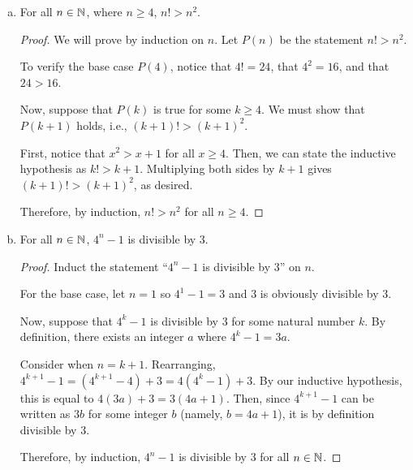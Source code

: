 \begin{enumerate}[(a)]
\begin{proof}
          Verify the base case $P(1)$:
          \[ \sum^1_{i=1} \frac{i}{2^i} = \frac{1}{2} = 2 - \frac{3}{2} = 2 -\frac{1+2}{2^1} \]
          Suppose that $P(k)$ holds for some $k$, and consider $P(k+1)$. Now,
          \begin{align*}
            \sum^{n+1}_{i=1} \frac{i}{2^i}
             & = \frac{k+1}{2^{k+1}} + \sum^n_{i=1} \frac{i}{2^i} \\
             & = \frac{k+1}{2^{k+1}} + 2-\frac{k+2}{2^k} \IH      \\
             & = 2 + \frac{k+1 - 2(k+2)}{2^{k+1}}                 \\
             & = 2 - \frac{k+3}{2^{k+1}}
          \end{align*}
          as required.
          Because $P(1)$ holds and $P(k)$ implies $P(k+1)$, by induction, $P(n)$ holds for all $n$.
        \end{proof}
  \item For all $n\in\mathbb{N}$, where $n \geq 4$, $n! > n^2$.
        \begin{proof}
          We will prove by induction on $n$.
          Let $P(n)$ be the statement $n! > n^2$.

          To verify the base case $P(4)$, notice that $4! = 24$, that $4^2 = 16$, and that $24 > 16$.

          Now, suppose that $P(k)$ is true for some $k \geq 4$.
          We must show that $P(k+1)$ holds, i.e., $(k+1)! > (k+1)^2$.

          First, notice that $x^2 > x+1$ for all $x \geq 4$.
          Then, we can state the inductive hypothesis as $k! > k+1$.
          Multiplying both sides by $k+1$ gives $(k+1)! > (k+1)^2$, as desired.

          Therefore, by induction, $n! > n^2$ for all $n \geq 4$.
        \end{proof}
  \item For all $n\in\mathbb{N}$, $4^n-1$ is divisible by 3.
        \begin{proof}
          Induct the statement ``$4^n-1$ is divisible by 3'' on $n$.

          For the base case, let $n=1$ so $4^1-1=3$ and 3 is obviously divisible by 3.

          Now, suppose that $4^k-1$ is divisible by 3 for some natural number $k$.
          By definition, there exists an integer $a$ where $4^k-1 = 3a$.

          Consider when $n = k+1$. Rearranging,
          $4^{k+1}-1 = (4^{k+1} - 4) + 3 = 4(4^k-1)+3$.
          By our inductive hypothesis, this is equal to $4(3a)+3 = 3(4a+1)$.
          Then, since $4^{k+1}-1$ can be written as $3b$ for some integer $b$ (namely, $b = 4a+1$),
          it is by definition divisible by 3.

          Therefore, by induction, $4^n-1$ is divisible by 3 for all $n\in\mathbb{N}$.
        \end{proof}
\end{enumerate}


